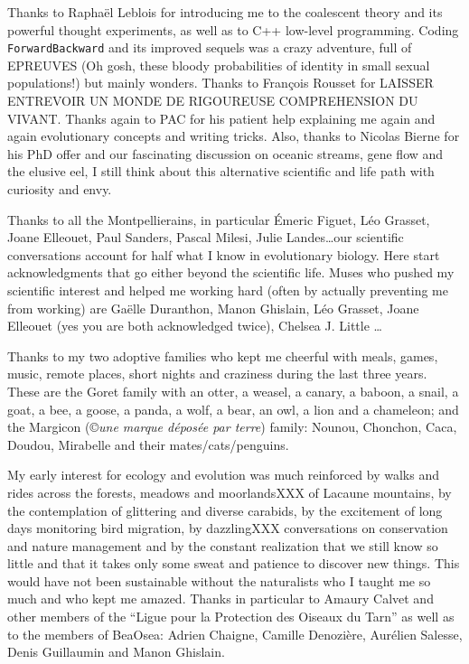 Thanks to Rapha\"{e}l Leblois for introducing me to the coalescent theory and its powerful thought experiments, as well as to C++ low-level programming. Coding \texttt{ForwardBackward} and its improved sequels was a crazy adventure, full of EPREUVES (Oh gosh, these bloody probabilities of identity in small sexual populations!) but mainly wonders. Thanks to Fran\c{c}ois Rousset for LAISSER ENTREVOIR UN MONDE DE RIGOUREUSE COMPREHENSION DU VIVANT.
Thanks again to PAC for his patient help explaining me again and again evolutionary concepts and writing tricks.
Also, thanks to Nicolas Bierne for his PhD offer and our fascinating discussion on oceanic streams, gene flow and the elusive eel, I still think about this alternative scientific and life path with curiosity and envy. 

Thanks to all the Montpellierains, in particular \'{E}meric Figuet, L\'{e}o Grasset, Joane Elleouet, Paul Sanders, Pascal Milesi, Julie Landes\dots our scientific conversations account for half what I know in evolutionary biology.
Here start acknowledgments that go either beyond the scientific life.
Muses who pushed my scientific interest and helped me working hard (often by actually preventing me from working)
are Ga\"elle Duranthon, Manon Ghislain, L\'{e}o Grasset, Joane Elleouet (yes you are both acknowledged twice), Chelsea J. Little \dots

Thanks to my two adoptive families who kept me cheerful with meals, games, music, remote places, short nights and craziness during the last three years. These are the Goret family with an otter, a weasel, a canary, a baboon, a snail, a goat, a bee, a goose, a panda, a wolf, a bear, an owl, a lion and a chameleon; and the Margicon (\copyright \textit{une marque d\'{e}pos\'{e}e par terre}) family: Nounou, Chonchon, Caca, Doudou, Mirabelle and their mates/cats/penguins.

My early interest for ecology and evolution was much reinforced by walks and rides across the forests, meadows and moorlandsXXX of Lacaune mountains, by the contemplation of glittering and diverse carabids, by the excitement of long days monitoring bird migration, by dazzlingXXX conversations on conservation and nature management and by the constant realization that we still know so little and that it takes only some sweat and patience to discover new things.
This would have not been sustainable without the naturalists who I taught me so much and who kept me amazed. Thanks in particular to Amaury Calvet and other members of the ``Ligue pour la Protection des Oiseaux du Tarn'' as well as to the members of BeaOsea: Adrien Chaigne, Camille Denozière, Aur\'{e}lien Salesse, Denis Guillaumin and Manon Ghislain.

